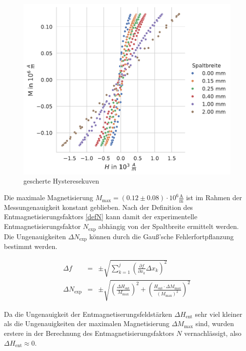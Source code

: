 \documentclass[12pt,a4paper]{scrartcl}
\numberwithin{equation}{section} %
\begin{document}
\begin{figure}[ht]
\centering
\includegraphics[scale=0.7]{../media/B2.4/3.3.3_overview.pdf}
\caption{gescherte Hysteresekuven}
\label{Abb: Scherung}
\end{figure}

Die maximale Magnetisierung $M_\mathrm{max} = (0.12\pm 0.08) \cdot 10^6 \mathrm{\frac{A}{m}}$ ist im Rahmen der Messungenauigkeit konstant geblieben. Nach der Definition des Entmagnetisierungsfaktors \eqref{defN} kann damit der experimentelle Entmagnetisierungsfaktor $N_\mathrm{exp}$ abhängig von der Spaltbreite ermittelt werden. Die Ungenauigkeiten $\Delta N_\mathrm{exp}$ können durch die Gauß'sche Fehlerfortpflanzung bestimmt werden.

\begin{eqnarray}
    \Delta f &=& \pm\sqrt{
        \sum_{k=1}^j
            \left(
                \frac{\partial f}{\partial x_k} \Delta x_k
            \right)^2
        } \\
    \Delta N_\mathrm{exp} &=&
        \pm\sqrt{
            \left(\frac{\Delta H_\mathrm{ent}}{M_\mathrm{max}}\right)^2
            + \left(\frac{H_\mathrm{ent}\cdot \Delta M_\mathrm{max}}{(M_\mathrm{max})^2}\right)^2       }
\end{eqnarray}

\noindent
Da die Ungenauigkeit der Entmagnetiserungsfeldstärken $\Delta H_\mathrm{ent}$ sehr viel kleiner als die Ungenauigkeiten der maximalen Magnetisierung $\Delta M_\mathrm{max}$ sind, wurden erstere in der Berechnung des Entmagnetisierungsfaktors $N$ vernachlässigt, also $\Delta H_\mathrm{ent}\approx 0$.
\end{document}
